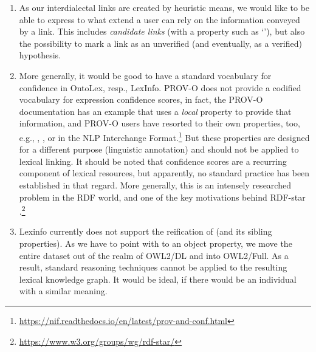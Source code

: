 \begin{enumerate}
\item As our interdialectal links are created by heuristic means, we would like to be able to express to what extend a user can rely on the information conveyed by a link. This includes \emph{candidate links} (with a property such as `'), but also the possibility to mark a link as an unverified (and eventually, as a verified) hypothesis.
\item More generally, it would be good to have a standard vocabulary for confidence in OntoLex, resp., LexInfo. 
PROV-O \cite{jing2015prov} does not provide a codified vocabulary for expression confidence scores, in fact, the PROV-O documentation has an example that uses a \emph{local} property to provide that information, and PROV-O users have resorted to their own properties, too, e.g., , , or  in the NLP Interchange Format.\footnote{\url{https://nif.readthedocs.io/en/latest/prov-and-conf.html}} But these properties are designed for a different purpose (linguistic annotation) and should not be applied to lexical linking. It should be noted that confidence scores are a recurring component of lexical resources, but apparently, no standard practice has been established in that regard.
More generally, this is an intensely researched problem in the RDF world, and one of the key motivations behind RDF-star \cite{rupp2024implementing}.\footnote{\url{https://www.w3.org/groups/wg/rdf-star/}}
\item Lexinfo currently does not support the reification of  (and its sibling properties). As we have to point with  to an object property, we move the entire dataset out of the realm of OWL2/DL and into OWL2/Full. As a result, standard reasoning techniques cannot be applied to the resulting lexical knowledge graph. It would be ideal, if there would be an individual with a similar meaning.
\end{enumerate}

